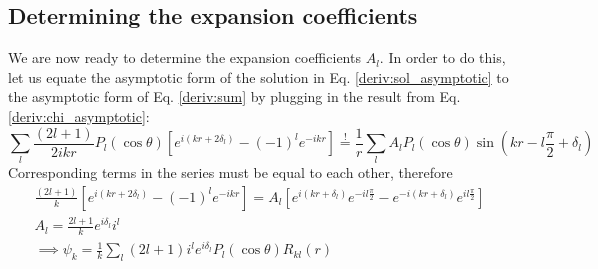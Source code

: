 \subsection{Determining the expansion coefficients}
We are now ready to determine the expansion coefficients \(A_l\). In order to do this, let us equate the asymptotic form of the solution in Eq. \eqref{deriv:sol_asymptotic} to the asymptotic form of Eq. \eqref{deriv:sum} by plugging in the result from Eq. \eqref{deriv:chi_asymptotic}:
\begin{equation}
	\sum_{l} \frac{(2l+1)}{2ikr} P_l(\cos \theta ) \left[e^{i(kr + 2 \delta _l)} - (-1)^{l} e^{-ikr} \right] \overset{!}{=} \frac{1}{r} \sum_{l} A_l P_l(\cos \theta ) \sin (kr-l \frac{\pi}{2} + \delta _l)
\end{equation}
Corresponding terms in the series must be equal to each other, therefore
\begin{gather}
	\frac{(2l+1)}{k}\left[ e^{i(kr+2\delta _l)}-(-1)^l e^{-ikr} \right]
	=
	A_l \left[e^{i(kr + \delta _l)} e^{- il \frac{\pi }{2} } - e^{-i(kr + \delta _l)}e^{il \frac{\pi }{2}} \right]\\
	A_l = \frac{2l+1}{k} e^{i \delta _l} i^l\\
	\implies 
	\psi _k = \frac{1}{k} \sum_{l} (2l+1)i^l e^{i \delta _l} P_l (\cos \theta ) R_{kl} (r) \label{deriv:expansion}
\end{gather}

